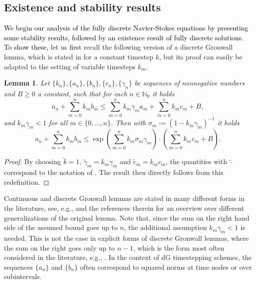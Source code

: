\documentclass{m2an}
\newcommand\blue[1]{\textcolor{black}{#1}}
\newtheorem{lemma}[theorem]{Lemma}
\newcommand{\N}{\mathbb{N}}
\begin{document}
\subsection{Existence and stability results}
\blue{We begin our analysis of the fully discrete Navier-Stokes equations by presenting some stability
results, followed by an existence result of fully discrete solutions. To show these,}
let us \blue{first} recall the following
version of a discrete Gronwall lemma,
which is stated in \cite[Lemma 5.1]{Heywood1990} for a constant timestep $k$, but its proof
can easily be adapted to the setting of variable timesteps $k_m$.
\begin{lemma}\label{lemm:discrete_gronwall}
  Let $\{k_n\}, \{a_n\}, \{b_n\}, \{c_n\}, \{\gamma_n\}$ be sequences of nonnegative numbers
  and $B \ge 0$ a constant, such that for each $n \in \N_0$ it holds
  \begin{equation*}
    a_n + \sum_{m=0}^n k_m b_m \le \sum_{m=0}^n k_m \gamma_m a_m + \sum_{m=0}^n k_m c_m + B,
  \end{equation*}
  and $k_m \gamma_m < 1$ for all $m \in \{0,...,n\}$.
  Then with $\sigma_m := (1 - k_m\gamma_m)^{-1}$ it holds
  \begin{equation*}
    a_n + \sum_{m=0}^n k_m b_m \le \exp \left( \sum_{m=0}^n k_m \sigma_m \gamma_m \right) \cdot
    \left(\sum_{m=0}^n k_m c_m + B\right).
  \end{equation*}
\end{lemma}
\begin{proof}
  By choosing $\widetilde k = 1$, $\widetilde \gamma_m = k_m \gamma_m$ and $\widetilde c_m = k_m c_m$,
  the quantities with $\widetilde \cdot$ correspond to the notation of \cite[Lemma 5.1]{Heywood1990}.
  The result then directly follows from this redefinition.
\end{proof}
Continuous and discrete Gronwall lemmas are stated in many different forms in the literature, see, e.g.,
\cite{li_generalized_2021} and the references therein for an overview over different generalizations
of the original lemma.
Note that, since the sum on the right hand side of the assumed bound goes up to $n$, 
the additional assumption $k_m \gamma_m < 1$ is needed. This is not the case in explicit forms 
of discrete Gronwall lemmas, where the sum on the right goes only up to $n-1$, which is the form
most often considered in the literature, e.g., \cite{pachpatte_integral_2006}.
In the context of dG timestepping schemes, the sequences $\{a_n\}$ and $\{b_n\}$
often correspond to squared norms at time nodes or over subintervals.
\end{document}
